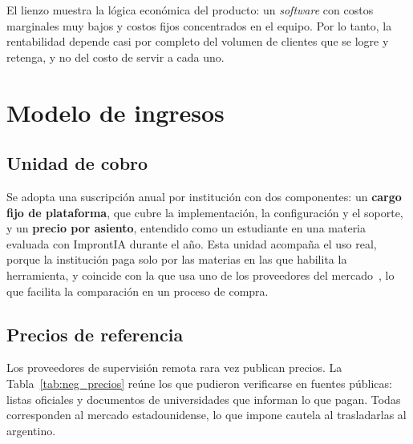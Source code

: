 El lienzo muestra la lógica económica del producto: un \textit{software} con costos marginales muy bajos y costos fijos concentrados en el equipo. Por lo tanto, la rentabilidad depende casi por completo del volumen de clientes que se logre y retenga, y no del costo de servir a cada uno.

\section{Modelo de ingresos}
\label{sec:neg_ingresos}

\subsection{Unidad de cobro}

Se adopta una suscripción anual por institución con dos componentes: un \textbf{cargo fijo de plataforma}, que cubre la implementación, la configuración y el soporte, y un \textbf{precio por asiento}, entendido como un estudiante en una materia evaluada con ImprontIA durante el año. Esta unidad acompaña el uso real, porque la institución paga solo por las materias en las que habilita la herramienta, y coincide con la que usa uno de los proveedores del mercado~\parencite{Respondus2026Pricing}, lo que facilita la comparación en un proceso de compra.

\subsection{Precios de referencia}

Los proveedores de supervisión remota rara vez publican precios. La Tabla~\ref{tab:neg_precios} reúne los que pudieron verificarse en fuentes públicas: listas oficiales y documentos de universidades que informan lo que pagan. Todas corresponden al mercado estadounidense, lo que impone cautela al trasladarlas al argentino.

